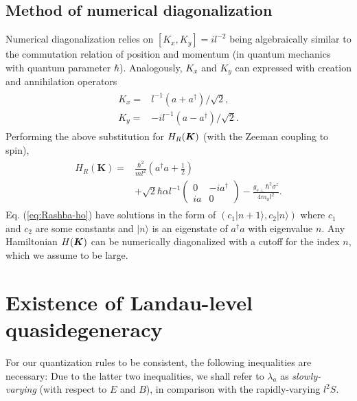 \documentclass[aps, showpacs, twocolumn, notitlepage, superscriptaddress]{revtex4-1}
\begin{document}
\subsection{Method of numerical diagonalization}\label{sec:numerical}

Numerical diagonalization relies on  $[K_x,K_y]=il^{-2}$ being algebraically similar  to the commutation relation  of position and momentum (in quantum mechanics with quantum parameter $\hbar$). Analogously, $K_x$ and $K_y$ can expressed with creation and annihilation operators
\begin{align}
\begin{split}
K_x=&l^{-1}(a+a^\dagger)/\sqrt{2},\\
K_y=&-il^{-1}(a-a^\dagger)/\sqrt{2}.
\end{split}
\end{align}
Performing the above substitution for  $H_R(\boldsymbol{K})$ (with the Zeeman coupling to spin),
\begin{align}
\begin{split}
H_{R}(\boldsymbol{K})=&\frac{\hbar^2}{ml^2}(a^{\dagger}a+\frac{1}{2})
\\&+\sqrt{2}\hbar\alpha l^{-1}\left(\begin{array}{cc}
0 & -ia^{\dagger}\\
ia & 0
\end{array}\right)
-\frac{g_{s\perp}\hbar^2\sigma^z}{4m_0l^2}.
\end{split}\label{eq:Rashba-ho}
\end{align}
Eq. (\ref{eq:Rashba-ho}) have solutions in the form of $(c_1|n+1\rangle,c_2|n\rangle)$ where $c_1$ and $c_2$ are some constants and $|n\rangle$ is an eigenstate of $a^\dagger a$ with eigenvalue $n$. Any Hamiltonian $H(\boldsymbol{K})$ can be numerically diagonalized with a  cutoff for the index $n$, which we assume to be large.

\section{Existence of Landau-level quasidegeneracy\label{sec:proofLLquasideg}}

For our quantization rules to be consistent, the following inequalities are necessary:
Due to the latter two inequalities, we shall refer to $\lambda_{a}$ as \textit{slowly-varying} (with respect to $E$ and $B$), in comparison with the rapidly-varying $l^2S$. 
\end{document}
